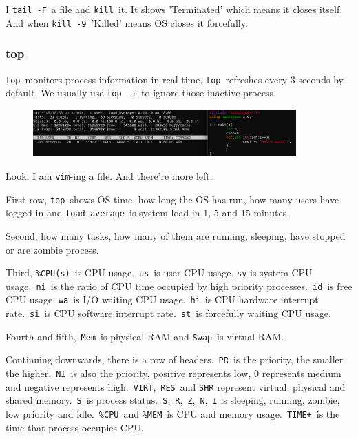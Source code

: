 \documentclass[12pt]{ctexart}
\begin{document}
I \texttt{tail\ -F}\ a file and \texttt{kill}\ it. It shows 'Terminated'
which means it closes itself. And when \texttt{kill\ -9}\ 'Killed' means
OS closes it forcefully.

\subsubsection{\textbf{top}}

\texttt{top}\ monitors process information in real-time. \texttt{top}\
refreshes every 3 seconds by default. We usually use \texttt{top\ -i}\ to
ignore those inactive process.

\begin{figure}[H]
    \centering
    \includegraphics[width=0.9\textwidth,keepaspectratio]{assets/Linux/1.10 Linux process commands/4.png}
\end{figure}

Look, I am \texttt{vim}-ing a file. And there're more
left.

First row, \texttt{top}\ shows OS time, how long the OS has run, how many
users have logged in and \texttt{load\ average}\ is system load in 1, 5
and 15 minutes.

Second, how many tasks, how many of them are running, sleeping, have
stopped or are zombie process.

Third, \texttt{\%CPU(s)}\ is CPU usage.\ \texttt{us}\ is user CPU usage.
\texttt{sy} is system CPU usage.\ \texttt{ni}\ is the ratio of CPU time
occupied by high priority processes.\ \texttt{id}\ is free CPU usage.
\texttt{wa}\ is I/O waiting CPU usage.\ \texttt{hi}\ is CPU hardware
interrupt rate.\ \texttt{si}\ is CPU software interrupt rate.\ \texttt{st}\
is forcefully waiting CPU usage.

Fourth and fifth,\ \texttt{Mem}\ is physical RAM and \texttt{Swap}\ is
virtual RAM.

Continuing downwards, there is a row of headers.\ \texttt{PR}\ is the
priority, the smaller the higher.\ \texttt{NI}\ is also the priority,
positive represents low, 0 represents medium and negative represents
high.\ \texttt{VIRT},\ \texttt{RES}\ and \texttt{SHR} represent virtual,
physical and shared memory.\ \texttt{S}\ is process status.\ \texttt{S},\
\texttt{R},\ \texttt{Z},\ \texttt{N},\ \texttt{I} is sleeping, running,
zombie, low priority and idle.\ \texttt{\%CPU}\ and \texttt{\%MEM}\ is CPU
and memory usage.\ \texttt{TIME+}\ is the time that process occupies CPU.
\end{document}
